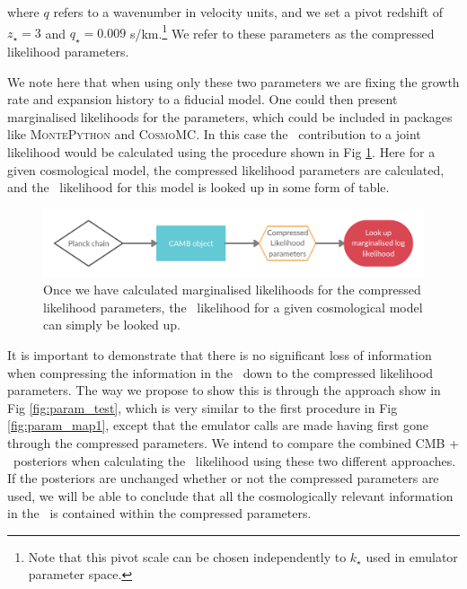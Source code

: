 \documentclass[preprintnumbers,prd,superscriptaddress,notitlepage,nofootinbib] {revtex4-1}
\def\afrhid#1{}
\begin{document}
where $q$ refers to a wavenumber in velocity units, and we set a pivot
redshift of $z_\star=3$ and $q_\star=0.009$ s/km.\footnote{Note that this pivot
scale can be chosen independently to $k_\star$ used in emulator parameter space.}
We refer to these parameters as the compressed likelihood parameters.
\afrhid{It might be useful to highlight that this pivot point does not need to match the
pivot point in the emulator.}
We note here that when using
only these two parameters we are fixing the growth rate and expansion
history to a fiducial model. One could then present marginalised likelihoods for
the parameters, which could be included in packages like \textsc{MontePython}
and \textsc{CosmoMC}. In this case the \lyaf\ contribution to a joint likelihood
would be calculated using the procedure shown in Fig \ref{fig:marginalised_compressed}.
Here for a given cosmological model, the compressed likelihood parameters are calculated,
and the \lyaf\ likelihood for this model is looked up in some form of table.

\begin{figure}[ht]
    \begin{center}
     \includegraphics[scale=0.2]{Figures/Marginalised_compressed.png}
    \end{center}
    \caption{Once we have calculated marginalised likelihoods for the compressed
    likelihood parameters, the \lyaf\ likelihood for a given cosmological model
    can simply be looked up.}
    \label{fig:marginalised_compressed}
\end{figure}

It is important to demonstrate that there is no significant loss of information
when compressing the information in the \lyaf\ down to the compressed likelihood
parameters. The way we propose to show this is through the approach show in
Fig \ref{fig:param_test}, which is very similar to the first procedure in Fig
\ref{fig:param_map1}, except that the emulator calls are made having first gone
through the compressed parameters. We intend to compare the combined CMB + \lyaf\
posteriors when calculating the \lyaf\ likelihood using these two different approaches.
If the posteriors are unchanged whether or not the compressed parameters are used,
we will be able to conclude that all the cosmologically relevant information
in the \lyaf\ is contained within the compressed parameters.
\end{document}

